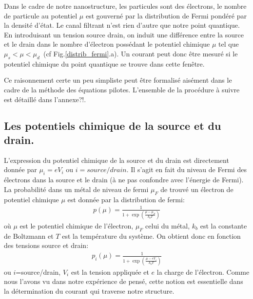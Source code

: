 Dans le cadre de notre nanostructure, les particules sont des électrons, le nombre de particule au potentiel $\mu$ est gouverné par la distribution de Fermi pondéré par la densité d'état. Le canal filtrant n'est rien d'autre que notre point quantique. En introduisant un tension source drain, on induit une différence entre la source et le drain dans le nombre d'électron possédant le potentiel chimique $\mu$ tel que $\mu_s < \mu < \mu_d$~(cf Fig.\ref{distrib_fermi}.a). Un courant peut donc \^etre mesuré si le potentiel chimique du point quantique se trouve dans cette fen\^etre.

Ce raisonnement certe un peu simpliste peut \^etre formalisé aisément dans le cadre de la méthode des équations pilotes. L'ensemble de la procédure à suivre est détaillé dans l'annexe?!.



\subsection{Les potentiels chimique de la source et du drain.}
L'expression du potentiel chimique de la source et du drain est directement donnée par $\mu_i = e V_i$ ou $i=source/drain$. Il s'agit en fait du niveau de Fermi des électrons dans la source et le drain (à ne pas confondre avec l'énergie de Fermi). La probabilité dans un métal de niveau de fermi $\mu_F$ de trouvé un électron de potentiel chimique $\mu$ est donnée par la distribution de fermi:
\begin{eqnarray}
p(\mu) = \frac{1}{1 + \exp{(\frac{\mu - \mu_F}{k_bT})}} \nonumber
\end{eqnarray}
où $\mu$ est le potentiel chimique de l'électron, $\mu_F$ celui du métal, $k_b$ est la constante de Boltzmann et $T$ est la température du système. On obtient donc en fonction des tensions source et drain:
\begin{eqnarray}
p_i(\mu) = \frac{1}{1 + \exp{(\frac{\mu - eV_i}{k_bT})}}
\end{eqnarray}
ou $i$=source/drain, $V_i$ est la tension appliquée et $e$ la charge de l'électron. Comme nous l'avons vu dans notre expérience de pensé, cette notion est essentielle dans la détermination du courant qui traverse notre structure.

